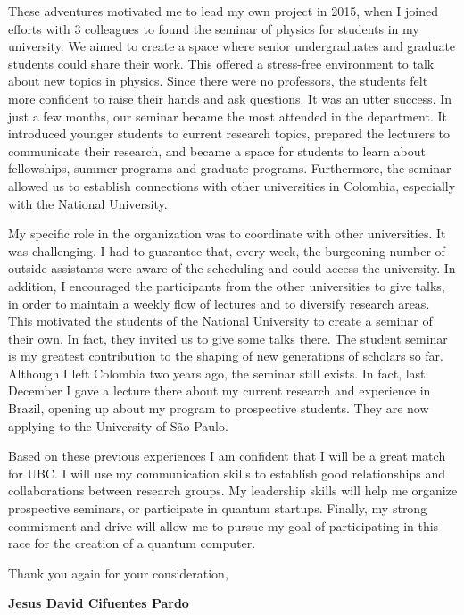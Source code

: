 These adventures motivated me to lead my own project in 2015, when I joined efforts with 3 colleagues to found the seminar of physics for students in my university. We aimed to create a space where senior undergraduates and graduate students could share their work. This offered a stress-free environment to talk about new topics in physics. Since there were no professors, the students felt more confident to raise their hands and ask questions. It was an utter success. In just a few months, our seminar became the most attended in the department. It introduced younger students to current research topics, prepared the lecturers to communicate their research, and became a space for students to learn about fellowships, summer programs and graduate programs. Furthermore, the seminar allowed us to establish connections with other universities in Colombia, especially with the National University. 

My specific role in the organization was to coordinate with other universities. It was challenging. I had to guarantee that, every week,  the burgeoning number of outside assistants were aware of the scheduling and could access the university. In addition, I encouraged the participants from the other universities to give talks, in order to maintain a weekly flow of lectures and to diversify research areas. This motivated the students of the National University to create a seminar of their own. In fact, they invited us to give some talks there. The student seminar is my greatest contribution to the shaping of new generations of scholars so far. Although I left Colombia two years ago, the seminar still exists. In fact, last December I gave a lecture there about my current research and experience in Brazil, opening up about my program to prospective students. They are now applying to the University of São Paulo.

Based on these previous experiences I am confident that I will be a great match for UBC.  I will use my communication skills to establish good relationships and collaborations between research groups. My leadership skills will help me organize prospective seminars, or participate in quantum startups. Finally, my strong commitment and drive will allow me to pursue my goal of participating in this race for the creation of a quantum computer.  


Thank you again for your consideration,
\vspace{0.7cm}

\textbf{Jesus David Cifuentes Pardo}

